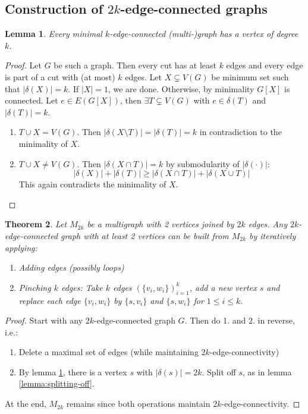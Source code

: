 \documentclass[11pt, a4paper]{article}
\newcommand{\abs}[1]{\left\lvert#1\right\rvert}
\newcommand{\set}[1]{\{#1\}}
\newtheorem{theorem}{Theorem}[section]
\newtheorem{lemma}[theorem]{Lemma}
\theoremstyle{remark}
\theoremstyle{definition}
\begin{document}
\subsection{Construction of \texorpdfstring{$2k$}{2k}-edge-connected graphs}
\begin{lemma}\label{lemma:min-edge-conn-degree}
	Every minimal $k$-edge-connected (multi-)graph has a vertex of degree $k$.
\end{lemma}
\begin{proof}
	Let $G$ be such a graph. Then every cut has at least $k$ edges and every
	edge is part of a cut with (at most) $k$ edges. Let $X\subsetneq V(G)$
	be minimum set such that $\abs{\delta(X)}=k$. If $\abs{X}=1$, we are done.
	Otherwise, by minimality $G[X]$ is connected. Let $e\in E(G[X])$, then
	$\exists T\subsetneq V(G)$ with $e\in\delta(T)$ and $\abs{\delta(T)}=k$.
	\begin{enumerate}
		\item[Case 1:] $T\cup X=V(G)$. Then $\abs{\delta(X\setminus
				T)}=\abs{\delta(T)}=k$ in contradiction to the minimality of $X$.

		\item[Case 2:] $T\cup X\neq V(G)$. Then $\abs{\delta(X\cap T)}=k$ by
		submodularity of $\abs{\delta(\cdot)}$:
		\[\abs{\delta(X)}+\abs{\delta(T)}\geq\abs{\delta(X\cap T)}+\abs{\delta(X\cup T)}\]
		This again contradicts the minimality of $X$.
	\end{enumerate}
\end{proof}

\begin{theorem}\label{thm:2k-edge-conn-structure}
	Let $M_{2k}$ be a multigraph with 2 vertices joined by $2k$ edges. Any
	$2k$-edge-connected graph with at least 2 vertices can be built from
	$M_{2k}$ by iteratively applying:
	\begin{enumerate}
		\item Adding edges (possibly loops)
		\item Pinching $k$ edges: Take $k$ edges
		$\left(\set{v_i,w_i}\right)_{i=1}^k$, add a new vertex $s$ and
		replace each edge $\set{v_i,w_i}$ by $\set{s,v_i}$ and $\set{s,w_i}$
		for $1\leq i\leq k$.
	\end{enumerate}
\end{theorem}
\begin{proof}
	Start with any $2k$-edge-connected graph $G$. Then do 1. and 2. in
	reverse, i.e.:
	\begin{enumerate}
		\item Delete a maximal set of edges (while maintaining
		$2k$-edge-connectivity)
		\item By lemma \ref{lemma:min-edge-conn-degree}, there is a vertex $s$ with
		$\abs{\delta(s)}=2k$. Split off $s$, as in lemma
		\ref{lemma:splitting-off}.
	\end{enumerate}
	At the end, $M_{2k}$ remains since both operations maintain $2k$-edge-connectivity.
\end{proof}
\end{document}
